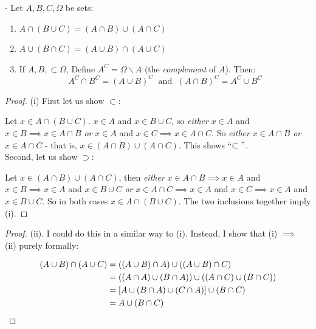 \documentclass[10pt]{scrartcl}
\begin{document}
\begin{proposition} - {\normalfont {}}
Let $A, B, C, \Omega$ be sets:
\begin{enumerate}
\item[\emph{(i)}] $A \cap (B \cup C) = (A \cap B) \cup (A \cap C)$
\item[\emph{(ii)}] $A \cup (B \cap C) = (A \cup B) \cap (A \cup C)$
\item[\emph{(ii)}] If $A, B, \subset \Omega$, Define $A^C = \Omega \backslash A$ (the \emph{complement} of $A$). Then:
\[
	A^C \cap B^C = (A \cup B)^C \; \text{ and } \; (A \cap B)^C = A^C \cup B^C
\]
\end{enumerate}\vsp

\end{proposition}

\begin{proof} (i)
First let us show $\subset$:

Let $x \in A \cap (B \cup C)$. $x \in A$ and $x \in B \cup C$, so \emph{either} $x \in A$ and $x \in B \implies x \in A\cap B$ \emph{or} $x \in A$ and $x \in C \implies x \in A \cap C$. 	So \emph{either} $x \in A \cap B$ \emph{or} $x \in A\cap C$ - that is, $x \in (A \cap B) \cup (A \cap C)$. This shows ``$\subset"$.\\

Second, let us show $\supset$: 

Let $x \in (A\cap B)\cup (A\cap C)$, then \emph{either} $x \in A\cap B \implies x \in A$ and $x \in B \implies x \in A$ and $x \in B \cup C$ \emph{or} $x \in A\cap C \implies x \in A$ and $x \in C \implies x \in A$ and $x \in B \cup C$. So in both cases $x \in A \cap (B \cup C)$. The two inclusions together imply (i). 
\end{proof}


\begin{proof} (ii). I could do this in a similar way to (i). Instead, I show that (i) $\implies$ (ii) purely formally: 

\begin{align*}
	  (A \cup B)\cap (A \cup C) &= ((A\cup B)\cap A)\cup ((A \cup B)\cap C)\\
  &= ((A\cap A)\cup (B\cap A))\cup ((A\cap C)\cup (B\cap C))\\
  &= [A \cup (B\cap A)\cup (C\cap A)] \cup (B\cap C)\\
  &= A \cup (B \cap C)\qedhere
\end{align*}
\end{proof}
\end{document}
